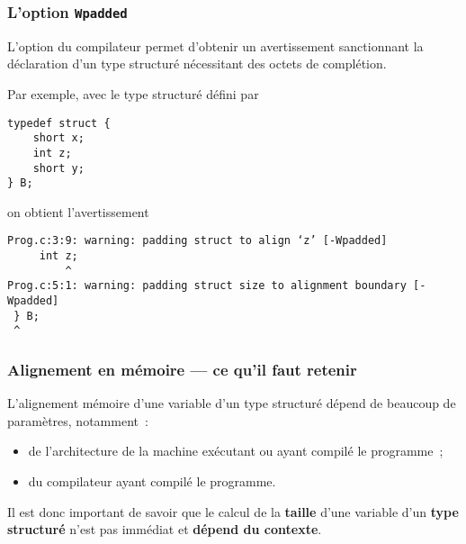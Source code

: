 \begin{frame}[fragile]
\frametitle{L'option {\tt Wpadded}}
L'option du compilateur  permet d'obtenir un avertissement
sanctionnant la déclaration d'un type structuré nécessitant des octets
de complétion.
\medskip

Par exemple, avec le type structuré  défini par
\begin{lstlisting}
typedef struct {
    short x;
    int z;
    short y;
} B;
\end{lstlisting}
on obtient l'avertissement
\begin{footnotesize}
\begin{verbatim}
Prog.c:3:9: warning: padding struct to align ‘z’ [-Wpadded]
     int z;
         ^
Prog.c:5:1: warning: padding struct size to alignment boundary [-Wpadded]
 } B;
 ^
\end{verbatim}
\end{footnotesize}
\end{frame}

\begin{frame}[fragile]
\frametitle{Alignement en mémoire --- ce qu'il faut retenir}
L'alignement mémoire d'une variable d'un type structuré dépend de
beaucoup de paramètres, notamment~:
\smallskip

\begin{itemize}
    \item de l'architecture de la machine exécutant ou ayant compilé le
    programme~;
    \smallskip

    \item du compilateur ayant compilé le programme.
\end{itemize}
\bigskip

Il est donc important de savoir que le calcul de la {\bf taille} d'une
variable d'un {\bf type structuré} n'est pas immédiat et
{\bf dépend du contexte}.
\end{frame}
